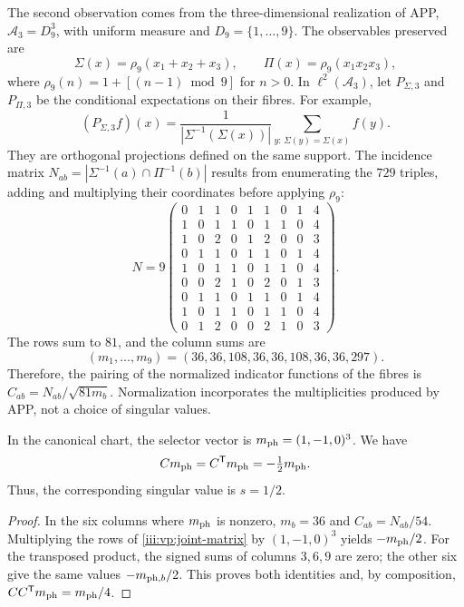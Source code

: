 The second observation comes from the three-dimensional realization of APP,
$\mathcal A_3=D_9^3$, with uniform measure and
$D_9=\{1,\ldots,9\}$. The observables preserved are
\[
 \Sigma(x)=\rho_9(x_1+x_2+x_3),\qquad
 \Pi(x)=\rho_9(x_1x_2x_3),
\]
where $\rho_9(n)=1+[(n-1)\bmod9]$ for $n>0$. In
$\ell^2(\mathcal A_3)$, let $P_{\Sigma,3}$ and $P_{\Pi,3}$ be
the conditional expectations on their fibres. For example,
\[
 (P_{\Sigma,3}f)(x)=
 \frac1{|\Sigma^{-1}(\Sigma(x))|}
 \sum_{y:\,\Sigma(y)=\Sigma(x)}f(y).
\]
They are orthogonal projections defined on the same support. The incidence
matrix $N_{ab}=|\Sigma^{-1}(a)\cap\Pi^{-1}(b)|$ results from
enumerating the $729$ triples, adding and multiplying their coordinates before
applying $\rho_9$:
\begin{equation}
 N=9\begin{pmatrix}
 0&1&1&0&1&1&0&1&4\\
 1&0&1&1&0&1&1&0&4\\
 1&0&2&0&1&2&0&0&3\\
 0&1&1&0&1&1&0&1&4\\
 1&0&1&1&0&1&1&0&4\\
 0&0&2&1&0&2&0&1&3\\
 0&1&1&0&1&1&0&1&4\\
 1&0&1&1&0&1&1&0&4\\
 0&1&2&0&0&2&1&0&3
 \end{pmatrix}.
 \label{iii:vp:joint-matrix}
\end{equation}
The rows sum to $81$, and the column sums are
\[
 (m_1,\ldots,m_9)=(36,36,108,36,36,108,36,36,297).
\]
Therefore, the pairing of the normalized indicator functions of the fibres
is $C_{ab}=N_{ab}/\sqrt{81m_b}$. Normalization incorporates the
multiplicities produced by APP, not a choice of singular values.

\begin{proposition}
In the canonical chart, the selector vector is
$m_{\rm ph}=(1,-1,0)^3$. We have
\begin{equation}
 Cm_{\rm ph}=C^{\mathsf T}m_{\rm ph}=-\tfrac12m_{\rm ph}.
 \label{iii:vp:trit-mode}
\end{equation}
Thus, the corresponding singular value is $s=1/2$.
\end{proposition}
\begin{proof}
In the six columns where $m_{\rm ph}$ is nonzero, $m_b=36$ and
$C_{ab}=N_{ab}/54$. Multiplying the rows of
\eqref{iii:vp:joint-matrix} by $(1,-1,0)^3$ yields
$-m_{\rm ph}/2$. For the transposed product, the signed sums
of columns $3,6,9$ are zero; the other six give the same
values $-m_{{\rm ph},b}/2$. This proves both identities and, by
composition, $CC^{\mathsf T}m_{\rm ph}=m_{\rm ph}/4$.
\end{proof}


